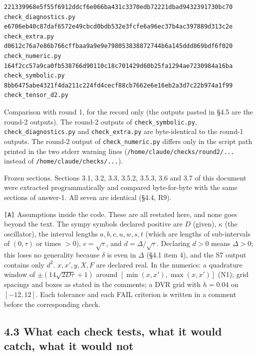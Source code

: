 \documentclass[11pt,a4paper]{article}
\begin{document}
\begin{lstlisting}
221339968e5f55f6912ddcf6e066ba431c3370edb72221dbad9432391730bc70  check_diagnostics.py
e6706eb40c87daf6572e49cbcd0bdb532e3fcfe6a96ec37b4ac397889d313c2e  check_extra.py
d0612c76a7e86b766cffbaa9a9e9e798053838872744b6a145ddd869bdf6f020  check_numeric.py
164f2cc57a9ca0fb538766d90110c18c701429d60b25fa1294ae7230984a16ba  check_symbolic.py
8bb6475abe4321f4da211c224fd4cecf88cb7662e6e16eb2a3d7c22b974a1f99  check_tensor_d2.py
\end{lstlisting}

Comparison with round 1, for the record only (the outputs pasted in §4.5 are the round-2 outputs). The round-2 outputs of \texttt{check\_symbolic.py}, \texttt{check\_diagnostics.py} and \texttt{check\_extra.py} are byte-identical to the round-1 outputs. The round-2 output of \texttt{check\_numeric.py} differs only in the script path printed in the two stderr warning lines (\texttt{/home/claude/checks/round2/...} instead of \texttt{/home/claude/checks/...}).

Frozen sections. Sections 3.1, 3.2, 3.3, 3.5.2, 3.5.3, 3.6 and 3.7 of this document were extracted programmatically and compared byte-for-byte with the same sections of answer-1. All seven are identical (§4.4, R9).

\texttt{[A]} Assumptions inside the code. These are all restated here, and none goes beyond the text. The sympy symbols declared positive are \(D\) (given), \(\kappa\) (the oscillator), the interval lengths \(a,b,c,u,w,s,t\) (which are lengths of sub-intervals of \((0,\tau)\) or times \(>0\)), \(e=\sqrt\tau\), and \(d=\Delta/\sqrt\tau\). Declaring \(d>0\) means \(\Delta>0\); this loses no generality because \(\delta\) is even in \(\Delta\) (§4.1 item 4), and the S7 output contains only \(d^2\). \(x,x',y,X,F\) are declared real. In the numerics: a quadrature window of \(\pm(14\sqrt{2D\tau}+1)\) around \([\min(x,x'),\max(x,x')]\) (N1); grid spacings and boxes as stated in the comments; a DVR grid with \(h=0.04\) on \([-12,12]\). Each tolerance and each FAIL criterion is written in a comment before the corresponding check.

\hypertarget{what-each-check-tests-what-it-would-catch-what-it-would-not}{%
\subsection{4.3 What each check tests, what it would catch, what it would not}\label{what-each-check-tests-what-it-would-catch-what-it-would-not}}
\end{document}

